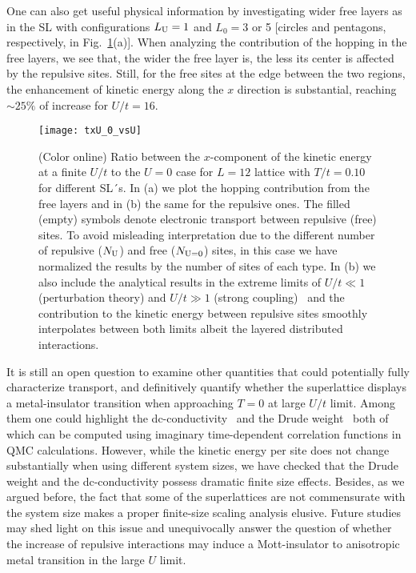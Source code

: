 \documentclass[aps,pra,reprint,twocolumn,showpacs,longbibliography,superscriptaddress]{revtex4-1}
\newcommand*{\tclp}{\textcolor{red}} %
\begin{document}
One can also get useful physical information by 
investigating wider free layers as in the SL with configurations $L_{\rm U} = 1$ and $L_0=3$ or 5 [circles and pentagons, respectively, in Fig.~\ref{fig:txU_0_vsU}(a)]. When analyzing the contribution of the hopping in the free layers, we see that, the wider the free layer is, the less its center is affected by the repulsive sites.  Still, for the free sites at the edge between the two regions, the enhancement of kinetic energy along the $x$ direction is substantial, reaching $\sim 25\%$ of increase for $U/t=16$.

\begin{figure}[!tb] %
  \texttt{[image: txU\_0\_vsU]}
 \caption{(Color online) Ratio between the $x$-component of the kinetic energy at a finite $U/t$ to the $U=0$ case for $L=12$ lattice with $T/t=0.10$ for different SL´s. In (a) we plot the hopping contribution from the free layers and in (b) the same for the repulsive ones. The filled (empty) symbols denote electronic transport between repulsive (free) sites. To avoid misleading interpretation due to the different number of repulsive ($N_{\rm U}$) and free ($N_{{\rm U}=0}$) sites, in this case we have normalized the results by the number of sites of each type. In (b) we also include the analytical results in the extreme limits of $U/t\ll1$ (perturbation theory) and $U/t\gg1$ (strong coupling)~\cite{White89b} and the contribution to the kinetic energy between repulsive sites smoothly interpolates between both limits albeit the layered distributed interactions.}
 \label{fig:txU_0_vsU}
\end{figure}



It is still an open question to examine other quantities that could potentially fully characterize transport, and definitively quantify whether the superlattice displays a metal-insulator transition when approaching $T=0$ at large $U/t$ limit. Among them one could highlight the dc-conductivity~\cite{Randeria1992,Trivedi1996} and the Drude weight~\cite{Scalapino93,Mondaini12} both of which can be computed using imaginary time-dependent correlation functions in QMC calculations. However, while the kinetic energy per site does not change substantially when using different system sizes, we have checked that the Drude weight and the dc-conductivity possess dramatic finite size effects. Besides, as we argued before, the fact that some of the superlattices are not commensurate with the system size makes a proper finite-size scaling analysis elusive. Future studies may shed light on this issue and unequivocally answer the question of whether the increase of repulsive interactions may induce a Mott-insulator to anisotropic metal transition in the large $U$ limit.
\end{document}
